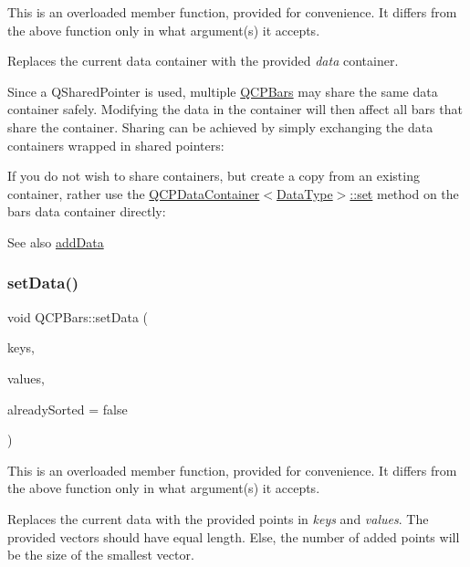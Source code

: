 This is an overloaded member function, provided for convenience. It differs from the above function only in what argument(s) it accepts.

Replaces the current data container with the provided {\itshape data} container.

Since a Q\+Shared\+Pointer is used, multiple \mbox{\hyperlink{class_q_c_p_bars}{Q\+C\+P\+Bars}} may share the same data container safely. Modifying the data in the container will then affect all bars that share the container. Sharing can be achieved by simply exchanging the data containers wrapped in shared pointers\+: 
\begin{DoxyCodeInclude}{0}
\end{DoxyCodeInclude}
 If you do not wish to share containers, but create a copy from an existing container, rather use the \mbox{\hyperlink{class_q_c_p_data_container_ae7042bd534fc3ce7befa2ce3f790b5bf}{Q\+C\+P\+Data\+Container$<$\+Data\+Type$>$\+::set}} method on the bar\textquotesingle{}s data container directly\+: 
\begin{DoxyCodeInclude}{0}
\end{DoxyCodeInclude}
 \begin{DoxySeeAlso}{See also}
\mbox{\hyperlink{class_q_c_p_bars_a323d6970d6d6e3166d89916a7f60f733}{add\+Data}} 
\end{DoxySeeAlso}
\mbox{\label{class_q_c_p_bars_a2a88cd5b16ec7b71e5a590f95b50c5ce}} 
\subsubsection{\texorpdfstring{setData()}{setData()}\hspace{0.1cm}{\footnotesize\ttfamily [2/2]}}
{\footnotesize\ttfamily void Q\+C\+P\+Bars\+::set\+Data (\begin{DoxyParamCaption}\item[{const Q\+Vector$<$ double $>$ \&}]{keys,  }\item[{const Q\+Vector$<$ double $>$ \&}]{values,  }\item[{bool}]{already\+Sorted = {\ttfamily false} }\end{DoxyParamCaption})}

This is an overloaded member function, provided for convenience. It differs from the above function only in what argument(s) it accepts.

Replaces the current data with the provided points in {\itshape keys} and {\itshape values}. The provided vectors should have equal length. Else, the number of added points will be the size of the smallest vector.


